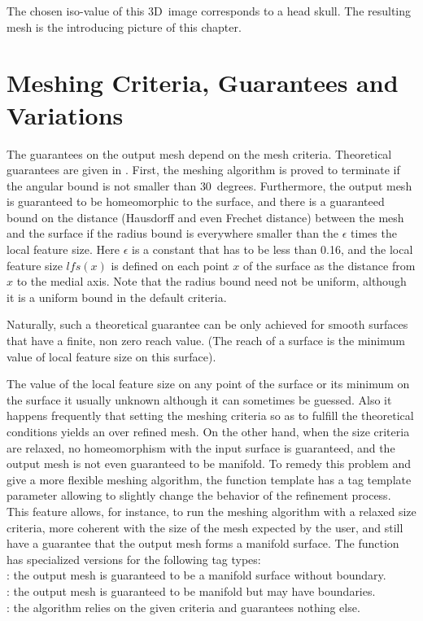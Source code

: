 The chosen iso-value of this 3D~image corresponds to a head skull. The
resulting mesh is the introducing picture of this chapter.


\section{Meshing Criteria, Guarantees and Variations}
\label{SurfaceMesher_section_criteria}
\label{SurfaceMesher_section_variations}

The guarantees on the output mesh depend on the mesh criteria.
Theoretical guarantees are given in \cite{cgal:bo-pgsms-05}.
First, the meshing algorithm is proved to terminate 
if the angular bound is
not smaller than $30$~degrees. 
Furthermore, the output mesh 
is guaranteed to be homeomorphic to the surface,
and  there is a guaranteed bound 
on the  distance (Hausdorff and even Frechet distance)
between the mesh and the surface
if the radius bound is everywhere smaller than 
the $\epsilon$ times the local feature size. 
Here $\epsilon$ is a constant that has to be
less than 0.16, and the local feature size 
$lfs(x)$ is defined on each point $x$ of the surface
as the distance from $x$ to the medial axis.  
Note that the radius bound need not be uniform,
although it is a uniform bound in the default criteria.

Naturally, such a theoretical guarantee can be only achieved
for smooth surfaces that have a finite, non zero
reach value. (The reach of a surface is the minimum value 
of local feature size on
this surface).

The value of the local feature size on any point of the surface
or its minimum on the surface it usually unknown
although it can sometimes be guessed. Also it happens frequently
that setting the meshing criteria so as to fulfill the theoretical
conditions yields an over refined mesh.
On the other hand, when the size criteria are relaxed,
no homeomorphism with the input surface is guaranteed,
and the output mesh is not even guaranteed to be manifold.
To remedy this problem and give a more flexible
meshing algorithm, the function template
 has a tag template parameter
allowing to slightly change the behavior of the refinement process.
This feature allows, for instance,  to run the meshing
algorithm with a relaxed size criteria, more coherent
with the size of the mesh expected by the user,
and still have a guarantee that
the output mesh forms a manifold surface.
The function  has specialized versions
for the following  tag types: \\
: the output mesh is guaranteed to be a manifold
surface without boundary.\\
: the output mesh is guaranteed to be
manifold but may have boundaries.\\
: the algorithm relies on the given criteria and
guarantees nothing else.




